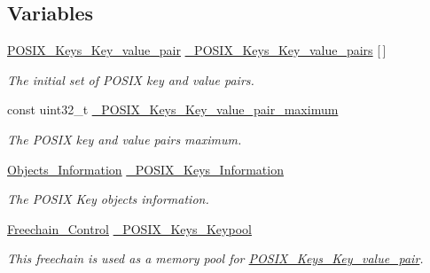 \subsection*{Variables}
\begin{DoxyCompactItemize}
\item 
\mbox{\hyperlink{structPOSIX__Keys__Key__value__pair}{P\+O\+S\+I\+X\+\_\+\+Keys\+\_\+\+Key\+\_\+value\+\_\+pair}} \mbox{\hyperlink{group__POSIX__KEY_ga9b1c7cc891d4110fdd12f849a0304adf}{\+\_\+\+P\+O\+S\+I\+X\+\_\+\+Keys\+\_\+\+Key\+\_\+value\+\_\+pairs}} \mbox{[}$\,$\mbox{]}
\begin{DoxyCompactList}\small\item\em The initial set of P\+O\+S\+IX key and value pairs. \end{DoxyCompactList}\item 
const uint32\+\_\+t \mbox{\hyperlink{group__POSIX__KEY_gabf185659e6528c2306cdc59f5d031b45}{\+\_\+\+P\+O\+S\+I\+X\+\_\+\+Keys\+\_\+\+Key\+\_\+value\+\_\+pair\+\_\+maximum}}
\begin{DoxyCompactList}\small\item\em The P\+O\+S\+IX key and value pairs maximum. \end{DoxyCompactList}\item 
\mbox{\label{group__POSIX__KEY_gae63f8071833e0cd4fdd10118bb499e2a}} 
\mbox{\hyperlink{structObjects__Information}{Objects\+\_\+\+Information}} \mbox{\hyperlink{group__POSIX__KEY_gae63f8071833e0cd4fdd10118bb499e2a}{\+\_\+\+P\+O\+S\+I\+X\+\_\+\+Keys\+\_\+\+Information}}
\begin{DoxyCompactList}\small\item\em The P\+O\+S\+IX Key objects information. \end{DoxyCompactList}\item 
\mbox{\label{group__POSIX__KEY_ga3be63baa487ec4bc3e1466d378bd1d86}} 
\mbox{\hyperlink{structFreechain__Control}{Freechain\+\_\+\+Control}} \mbox{\hyperlink{group__POSIX__KEY_ga3be63baa487ec4bc3e1466d378bd1d86}{\+\_\+\+P\+O\+S\+I\+X\+\_\+\+Keys\+\_\+\+Keypool}}
\begin{DoxyCompactList}\small\item\em This freechain is used as a memory pool for \mbox{\hyperlink{structPOSIX__Keys__Key__value__pair}{P\+O\+S\+I\+X\+\_\+\+Keys\+\_\+\+Key\+\_\+value\+\_\+pair}}. \end{DoxyCompactList}\end{DoxyCompactItemize}


